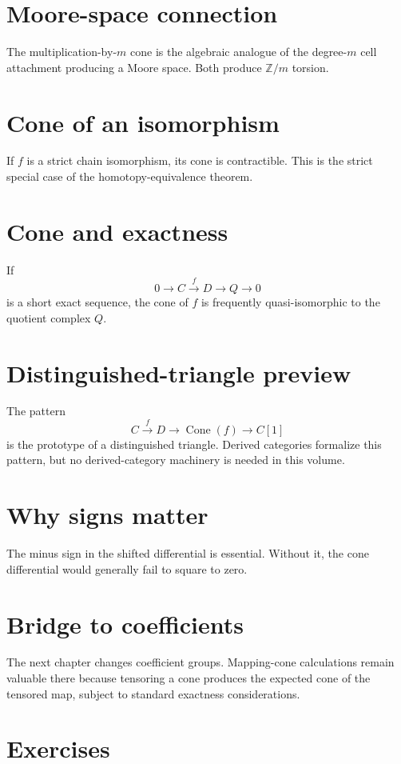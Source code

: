 \section{Moore-space connection}
The multiplication-by-\(m\) cone is the algebraic analogue of the degree-\(m\)
cell attachment producing a Moore space.  Both produce \(\mathbb Z/m\) torsion.

\section{Cone of an isomorphism}
If \(f\) is a strict chain isomorphism, its cone is contractible.  This is the
strict special case of the homotopy-equivalence theorem.

\section{Cone and exactness}
If
\[
0\to C\xrightarrow{f}D\to Q\to0
\]
is a short exact sequence, the cone of \(f\) is frequently quasi-isomorphic to
the quotient complex \(Q\).

\section{Distinguished-triangle preview}
The pattern
\[
C\xrightarrow f D\to\operatorname{Cone}(f)\to C[1]
\]
is the prototype of a distinguished triangle.  Derived categories formalize
this pattern, but no derived-category machinery is needed in this volume.

\section{Why signs matter}
The minus sign in the shifted differential is essential.  Without it, the cone
differential would generally fail to square to zero.

\section{Bridge to coefficients}
The next chapter changes coefficient groups.  Mapping-cone calculations remain
valuable there because tensoring a cone produces the expected cone of the
tensored map, subject to standard exactness considerations.


\section{Exercises}

